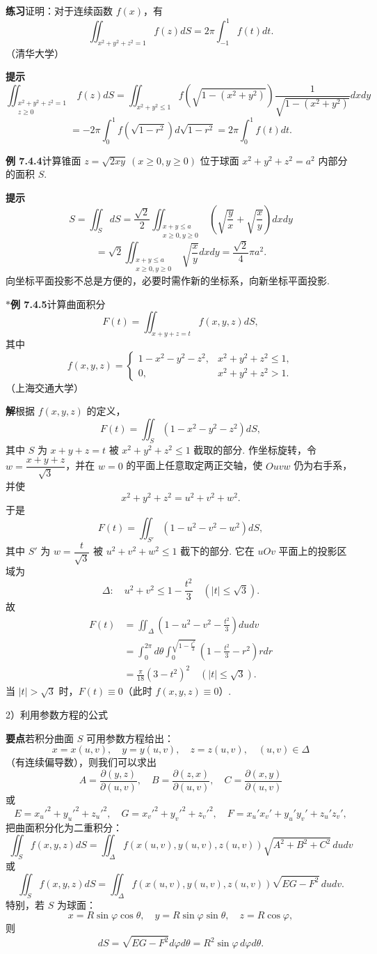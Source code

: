 \documentclass[UTF8, 12pt, fontset=fandol, oneside]{ctexart}
\begin{document}
\noindent\textbf{练习}\quad 证明：对于连续函数 $f(x)$，有
\[
\iint_{x^2+y^2+z^2=1}f(z)dS=2\pi\int_{-1}^1f(t)dt.
\]
（清华大学）

\noindent\textbf{提示}\quad
\[
\iint_{\substack{x^2+y^2+z^2=1\\ z\ge0}}f(z)dS
=\iint_{x^2+y^2\le1}
f\left(\sqrt{1-(x^2+y^2)}\right)
\frac1{\sqrt{1-(x^2+y^2)}}dxdy
\]
\[
=-2\pi\int_0^1f\left(\sqrt{1-r^2}\right)d\sqrt{1-r^2}
=2\pi\int_0^1f(t)dt.
\]

\noindent\textbf{例 7.4.4}\quad 计算锥面 $z=\sqrt{2xy}\ (x\ge0,y\ge0)$ 位于球面 $x^2+y^2+z^2=a^2$ 内部分的面积 $S$.

\noindent\textbf{提示}\quad
\[
S=\iint_SdS
=\frac{\sqrt2}{2}\iint_{\substack{x+y\le a\\x\ge0,y\ge0}}
\left(\sqrt{\frac yx}+\sqrt{\frac xy}\right)dxdy
\]
\[
=\sqrt2\iint_{\substack{x+y\le a\\x\ge0,y\ge0}}\sqrt{\frac xy}dxdy
=\frac{\sqrt2}{4}\pi a^2.
\]
向坐标平面投影不总是方便的，必要时需作新的坐标系，向新坐标平面投影.

\noindent\textbf{$*$例 7.4.5}\quad 计算曲面积分
\[
F(t)=\iint_{x+y+z=t}f(x,y,z)dS,
\]
其中
\[
f(x,y,z)=
\begin{cases}
1-x^2-y^2-z^2, & x^2+y^2+z^2\le1,\\
0, & x^2+y^2+z^2>1.
\end{cases}
\]
（上海交通大学）

\noindent\textbf{解}\quad 根据 $f(x,y,z)$ 的定义，
\[
F(t)=\iint_S(1-x^2-y^2-z^2)dS,
\]
其中 $S$ 为 $x+y+z=t$ 被 $x^2+y^2+z^2\le1$ 截取的部分. 作坐标旋转，令 $w=\dfrac{x+y+z}{\sqrt3}$，并在 $w=0$ 的平面上任意取定两正交轴，使 $Ouvw$ 仍为右手系，并使
\[
x^2+y^2+z^2=u^2+v^2+w^2.
\]
于是
\[
F(t)=\iint_{S'}\left(1-u^2-v^2-w^2\right)dS,
\]
其中 $S'$ 为 $w=\dfrac t{\sqrt3}$ 被 $u^2+v^2+w^2\le1$ 截下的部分. 它在 $uOv$ 平面上的投影区域为
\[
\Delta:\quad u^2+v^2\le1-\frac{t^2}3\quad(|t|\le\sqrt3).
\]
故
\[
\begin{aligned}
F(t)
&=\iint_\Delta\left(1-u^2-v^2-\frac{t^2}3\right)dudv\\
&=\int_0^{2\pi}d\theta\int_0^{\sqrt{1-\frac{t^2}3}}
\left(1-\frac{t^2}3-r^2\right)rdr\\
&=\frac\pi{18}(3-t^2)^2\quad(|t|\le\sqrt3).
\end{aligned}
\]
当 $|t|>\sqrt3$ 时，$F(t)\equiv0$（此时 $f(x,y,z)\equiv0$）.

2）利用参数方程的公式

\noindent\textbf{要点}\quad 若积分曲面 $S$ 可用参数方程给出：
\[
x=x(u,v),\quad y=y(u,v),\quad z=z(u,v),\quad (u,v)\in\Delta
\]
（有连续偏导数），则我们可以求出
\[
A=\frac{\partial(y,z)}{\partial(u,v)},\quad
B=\frac{\partial(z,x)}{\partial(u,v)},\quad
C=\frac{\partial(x,y)}{\partial(u,v)}
\]
或
\[
E=x_u'^2+y_u'^2+z_u'^2,\quad
G=x_v'^2+y_v'^2+z_v'^2,\quad
F=x_u'x_v'+y_u'y_v'+z_u'z_v',
\]
把曲面积分化为二重积分：
\[
\iint_Sf(x,y,z)dS
=\iint_\Delta f(x(u,v),y(u,v),z(u,v))
\sqrt{A^2+B^2+C^2}\,dudv
\]
或
\[
\iint_Sf(x,y,z)dS
=\iint_\Delta f(x(u,v),y(u,v),z(u,v))\sqrt{EG-F^2}\,dudv.
\]
特别，若 $S$ 为球面：
\[
x=R\sin\varphi\cos\theta,\quad
y=R\sin\varphi\sin\theta,\quad
z=R\cos\varphi,
\]
则
\[
dS=\sqrt{EG-F^2}d\varphi d\theta=R^2\sin\varphi\,d\varphi d\theta.
\]
\end{document}
